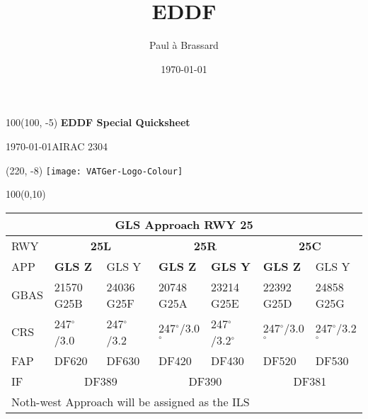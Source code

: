 \documentclass[10pt,landscape,a4paper]{article}
\title{EDDF}
\author{Paul à Brassard}
\date{\today}
\begin{document}
\setlength\extrarowheight{1pt}

\setlength{\TPHorizModule}{1mm}
\setlength{\TPVertModule}{\TPHorizModule}
\textblockorigin{7mm}{12mm}

\begin{textblock}{100}(100, -5)
  \large
  \centering
  \textbf{EDDF Special Quicksheet}

  \today \space AIRAC 2304
\end{textblock}
\begin{textblock}{2}(220, -8)
  \texttt{[image: VATGer-Logo-Colour]}
\end{textblock}

\begin{textblock}{100}(0,10)
\begin{table}[]
\begin{tabular}{|l|l|l|l|l|l|l|}
\multicolumn{7}{c}{\textbf{GLS Approach RWY 25}} \\ \hline
RWY  & \multicolumn{2}{c|}{\textbf{25L}} & \multicolumn{2}{c|}{\textbf{25R}} & \multicolumn{2}{c|}{\textbf{25C}} \\ \hline
APP  & \textbf{GLS Z} & GLS Y & \textbf{GLS Z} & \textbf{GLS Y} & \textbf{GLS Z} & GLS Y \\
GBAS & 21570 G25B & 24036 G25F & 20748 G25A & 23214 G25E & 22392 G25D  & 24858 G25G \\
CRS  & 247$^\circ$/3.0 & 247$^\circ$/3.2 & 247$^\circ$/3.0$^\circ$ & 247$^\circ$/3.2$^\circ$ & 247$^\circ$/3.0$^\circ$ & 247$^\circ$/3.2$^\circ$ \\
FAP  & DF620 & DF630 & DF420 & DF430 & DF520 & DF530 \\ \hline
IF   & \multicolumn{2}{c|}{DF389} & \multicolumn{2}{c|}{DF390} & \multicolumn{2}{c|}{DF381} \\ \hline
\multicolumn{6}{l}{Noth-west Approach will be assigned as the ILS}\\
\end{tabular}
\end{table}
\end{textblock}
\end{document}
